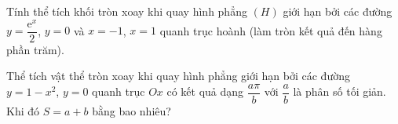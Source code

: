 \begin{bt}%
	Tính thể  tích khối tròn xoay khi quay hình phẳng $(H)$ giới hạn bởi các đường $y=\dfrac{\mathrm{e}^x}{2}$, $y=0$ và $x=-1$, $x=1$ quanh trục hoành (làm tròn kết quả đến hàng phần trăm).
\end{bt}

\begin{bt}%
	Thể tích vật thể tròn xoay khi quay hình phẳng giới hạn bởi  các đường $y=1-x^2$, $y=0$ quanh trục $Ox$ có kết quả dạng $\dfrac{a\pi}{b}$ với $\dfrac{a}{b}$ là phân số tối giản. Khi đó $S=a+b$ bằng bao nhiêu?
\end{bt}

